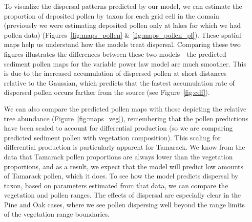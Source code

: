 \documentclass[12pt]{article}
\begin{document}



To visualize the dispersal patterns predicted by our model, we can
estimate the proportion of deposited pollen by taxon for each grid
cell in the domain (previously we were estimating deposited pollen
only at lakes for which we had pollen data)
(Figures~\ref{fig:maps_pollen} \& \ref{fig:maps_pollen_pl}). These
spatial maps help us understand how the models treat
dispersal. Comparing these two figures illustrates the differences
between these two models - the predicted sediment pollen maps for the
variable power law model are much smoother. This is due to the
increased accumulation of dispersed pollen at short distances relative
to the Gaussian, which predicts that the fastest accumulation rate of
dispersed pollen occurs farther from the source (see
Figure~\ref{fig:cdf}).


We can also compare the predicted pollen maps with those depicting the
relative tree abundance (Figure~\ref{fig:maps_veg}), remembering that
the pollen predictions have been scaled to account for differential
production (so we are comparing predicted sediment pollen with
vegetation composition). This scaling for differential production is
particularly apparent for Tamarack. We know from the data that
Tamarack pollen proportions are always lower than the vegetation
proportions, and as a result, we expect that the model will predict
low amounts of Tamarack pollen, which it does. To see how the model
predicts dispersal by taxon, based on parameters estimated from that
data, we can compare the vegetation and pollen ranges. The effects of
dispersal are especially clear in the Pine and Oak cases, where we see
pollen dispersing well beyond the range limits of the vegetation range
boundaries.
\end{document}
